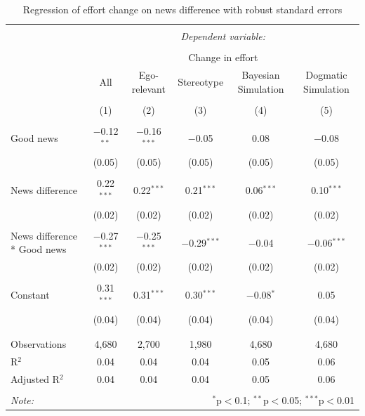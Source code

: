 \documentclass[
  12pt,
]{article}
\begin{document}
\begin{table} \centering 
  \caption{Regression of effort change on news difference with robust standard errors} 
  \label{tab:regression} 
\begin{tabular}{@{\extracolsep{5pt}}lccccc} 
\\[-1.8ex]\hline 
\hline \\[-1.8ex] 
 & \multicolumn{5}{c}{\textit{Dependent variable:}} \\ 
\cline{2-6} 
\\[-1.8ex] & \multicolumn{5}{c}{Change in effort} \\ 
 & All & Ego-relevant & Stereotype & Bayesian Simulation & Dogmatic Simulation \\ 
\\[-1.8ex] & (1) & (2) & (3) & (4) & (5)\\ 
\hline \\[-1.8ex] 
 Good news & $-$0.12$^{**}$ & $-$0.16$^{***}$ & $-$0.05 & 0.08 & $-$0.08 \\ 
  & (0.05) & (0.05) & (0.05) & (0.05) & (0.05) \\ 
  & & & & & \\ 
 News difference & 0.22$^{***}$ & 0.22$^{***}$ & 0.21$^{***}$ & 0.06$^{***}$ & 0.10$^{***}$ \\ 
  & (0.02) & (0.02) & (0.02) & (0.02) & (0.02) \\ 
  & & & & & \\ 
 News difference * Good news & $-$0.27$^{***}$ & $-$0.25$^{***}$ & $-$0.29$^{***}$ & $-$0.04 & $-$0.06$^{***}$ \\ 
  & (0.02) & (0.02) & (0.02) & (0.02) & (0.02) \\ 
  & & & & & \\ 
 Constant & 0.31$^{***}$ & 0.31$^{***}$ & 0.30$^{***}$ & $-$0.08$^{*}$ & 0.05 \\ 
  & (0.04) & (0.04) & (0.04) & (0.04) & (0.04) \\ 
  & & & & & \\ 
\hline \\[-1.8ex] 
Observations & 4,680 & 2,700 & 1,980 & 4,680 & 4,680 \\ 
R$^{2}$ & 0.04 & 0.04 & 0.04 & 0.05 & 0.06 \\ 
Adjusted R$^{2}$ & 0.04 & 0.04 & 0.04 & 0.05 & 0.06 \\ 
\hline 
\hline \\[-1.8ex] 
\textit{Note:}  & \multicolumn{5}{r}{$^{*}$p$<$0.1; $^{**}$p$<$0.05; $^{***}$p$<$0.01} \\ 
\end{tabular} 
\end{table}
\end{document}
